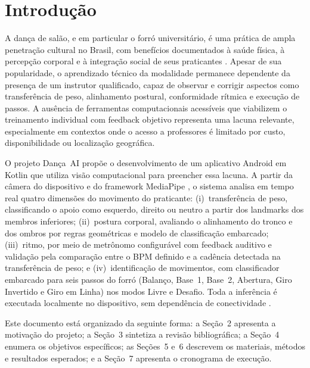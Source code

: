 \newpage
\section{Introdução}
\label{sec:revisao-introducao}

A dança de salão, e em particular o forró universitário, é uma prática de
ampla penetração cultural no Brasil, com benefícios documentados à saúde
física, à percepção corporal e à integração social de seus praticantes
\cite{havt2026dancar, fonseca2012, paiva2019danca}. Apesar de sua
popularidade, o aprendizado técnico da modalidade permanece dependente da
presença de um instrutor qualificado, capaz de observar e corrigir aspectos
como transferência de peso, alinhamento postural, conformidade rítmica e
execução de passos. A ausência de ferramentas computacionais acessíveis que
viabilizem o treinamento individual com feedback objetivo representa uma
lacuna relevante, especialmente em contextos onde o acesso a professores é
limitado por custo, disponibilidade ou localização geográfica.

O projeto Dança~AI propõe o desenvolvimento de um aplicativo Android em Kotlin
que utiliza visão computacional para preencher essa lacuna. A partir da câmera
do dispositivo e do framework MediaPipe \cite{lugaresi2019mediapipe,
bazarevsky2020blazeposeondevicerealtimebody}, o sistema analisa em tempo real
quatro dimensões do movimento do praticante: (i)~transferência de peso,
classificando o apoio como esquerdo, direito ou neutro a partir dos landmarks
dos membros inferiores; (ii)~postura corporal, avaliando o alinhamento do
tronco e dos ombros por regras geométricas e modelo de classificação embarcado;
(iii)~ritmo, por meio de metrônomo configurável com feedback auditivo e
validação pela comparação entre o BPM definido e a cadência detectada na
transferência de peso; e (iv)~identificação de movimentos, com classificador
embarcado para seis passos do forró (Balanço, Base~1, Base~2, Abertura, Giro
Invertido e Giro em Linha) nos modos Livre e Desafio. Toda a inferência é
executada localmente no dispositivo, sem dependência de conectividade
\cite{lee2019ondevice, li2020edgeai}.

Este documento está organizado da seguinte forma: a Seção~2 apresenta a
motivação do projeto; a Seção~3 sintetiza a revisão bibliográfica; a Seção~4
enumera os objetivos específicos; as Seções~5 e~6 descrevem os materiais,
métodos e resultados esperados; e a Seção~7 apresenta o cronograma de execução.
